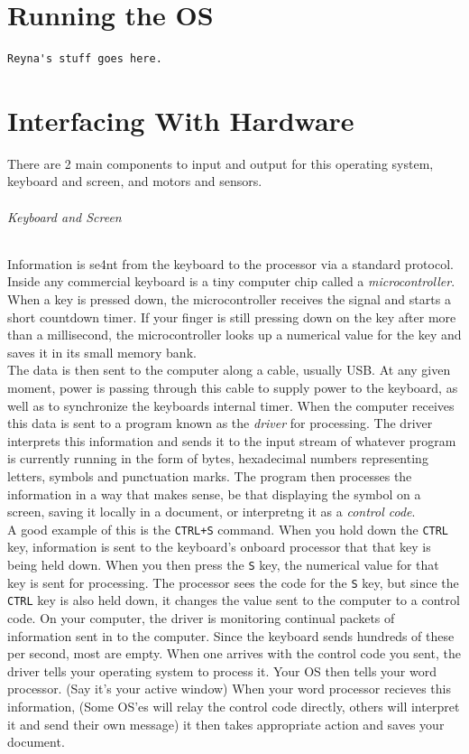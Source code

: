 \documentclass[english]{article}
\begin{document}
\part{Running the OS}

\begin{lstlisting}
Reyna's stuff goes here.
\end{lstlisting}



\part{Interfacing With Hardware}
There are 2 main components to input and output for this operating system, keyboard and screen, and motors and sensors.
\paragraph{Keyboard and Screen}
Information is se4nt from the keyboard to the processor via a standard protocol. Inside any commercial keyboard is a tiny computer chip
called a {\it microcontroller}. When a key is pressed down, the microcontroller receives the signal and starts a short countdown timer. If your finger is still pressing down on the key after more than a millisecond, the microcontroller looks up a numerical value for the key
and saves it in its small memory bank.
\break
\\The data is then sent to the computer along a cable, usually USB. At any given moment, power
is passing through this cable to supply power to the keyboard, as well as to synchronize the keyboards internal timer. When the
computer receives this data is sent to a program known as the {\it driver} for processing. The driver interprets this information
and sends it to the input stream of whatever program is currently running in the form of bytes, hexadecimal numbers representing
letters, symbols and punctuation marks. The program then processes the information in a way that makes sense, be that displaying
the symbol on a screen, saving it locally in a document, or interpretng it as a {\it control code}.
\break
\\A good example of this is the \texttt{CTRL+S} command. When you hold down the \texttt{CTRL} key, information is sent to the keyboard's onboard processor that that key is being held down. When you then press the \texttt{S} key, the numerical value for that key is sent for processing. The processor sees the code for the \texttt{S} key, but since the \texttt{CTRL} key is also held down, it changes the value sent to the computer to a control code. On your computer, the driver is monitoring continual packets of information sent in to the computer. Since the keyboard sends hundreds of these per second, most are empty. When one arrives with the control code you sent, the driver tells your operating system to process it. Your OS then tells your word processor. (Say it's your active window) When your word processor recieves this information, (Some OS'es will relay the control code directly, others will interpret it and send their own message) it then takes appropriate action and saves your document.
\end{document}
